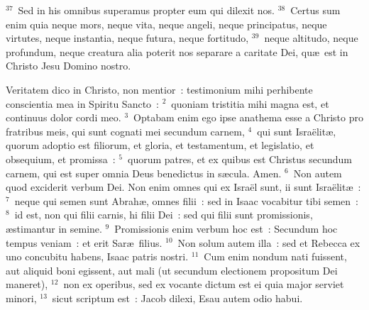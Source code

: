 ${}^{37}$~Sed in his omnibus superamus propter eum qui dilexit nos.
${}^{38}$~Certus sum enim quia neque mors, neque vita, neque angeli, neque principatus, neque virtutes, neque instantia, neque futura, neque fortitudo,
${}^{39}$~neque altitudo, neque profundum, neque creatura alia poterit nos separare a caritate Dei, qu\ae\ est in Christo Jesu Domino nostro.

\lettrine[lines=10,image=true,loversize=0.05,lraise=-0.03]{V}{}eritatem dico in Christo, non mentior~: testimonium mihi perhibente conscientia mea in Spiritu Sancto~:
${}^{2}$~quoniam tristitia mihi magna est, et continuus dolor cordi meo.
${}^{3}$~Optabam enim ego ipse anathema esse a Christo pro fratribus meis, qui sunt cognati mei secundum carnem,
${}^{4}$~qui sunt Isra\"elit\ae , quorum adoptio est filiorum, et gloria, et testamentum, et legislatio, et obsequium, et promissa~:
${}^{5}$~quorum patres, et ex quibus est Christus secundum carnem, qui est super omnia Deus benedictus in s\ae cula. Amen.
${}^{6}$~Non autem quod exciderit verbum Dei. Non enim omnes qui ex Isra\"el sunt, ii sunt Isra\"elit\ae~:
${}^{7}$~neque qui semen sunt Abrah\ae , omnes filii~: sed in Isaac vocabitur tibi semen~:
${}^{8}$~id est, non qui filii carnis, hi filii Dei~: sed qui filii sunt promissionis, \ae stimantur in semine.
${}^{9}$~Promissionis enim verbum hoc est~: Secundum hoc tempus veniam~: et erit Sar\ae\ filius.
${}^{10}$~Non solum autem illa~: sed et Rebecca ex uno concubitu habens, Isaac patris nostri.
${}^{11}$~Cum enim nondum nati fuissent, aut aliquid boni egissent, aut mali (ut secundum electionem propositum Dei maneret),
${}^{12}$~non ex operibus, sed ex vocante dictum est ei quia major serviet minori,
${}^{13}$~sicut scriptum est~: Jacob dilexi, Esau autem odio habui.


